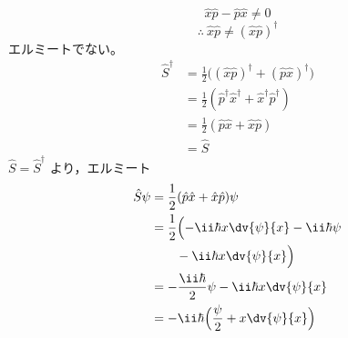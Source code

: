 \[ \hat{x}\hat{p}-\hat{p}\hat{x}\neq0 \]
\[ \therefore\ \hat{x}\hat{p}\neq(\hat{x}\hat{p})^{\dagger} \]
エルミートでない。
\begin{align*}
\hat{S}^{\dagger}&=\frac{1}{2}\bigl((\hat{x}\hat{p})^{\dagger}+(\hat{p}\hat{x})^{\dagger}\bigr)\\
&=\frac{1}{2}(\hat{p}^{\dagger}\hat{x}^{\dagger}+\hat{x}^{\dagger}\hat{p}^{\dagger})\\
&=\frac{1}{2}(\hat{p}\hat{x}+\hat{x}\hat{p})\\
&=\hat{S}
\end{align*}
$\hat{S}=\hat{S}^{\dagger}$ より，エルミート
\begin{align*}
\hat{S}\psi&=\frac{1}{2}(\hat{p}\hat{x}+\hat{x}\hat{p})\psi\\
&=\frac{1}{2}\Bigl(-\ii\hbar x\dv{\psi}{x}-\ii\hbar\psi\\
&\qquad-\ii\hbar x\dv{\psi}{x}\Bigr)\\
&=-\frac{\ii\hbar}{2}\psi-\ii\hbar x\dv{\psi}{x}\\
&=-\ii\hbar\Bigl(\frac{\psi}{2}+x\dv{\psi}{x}\Bigr)
\end{align*}
